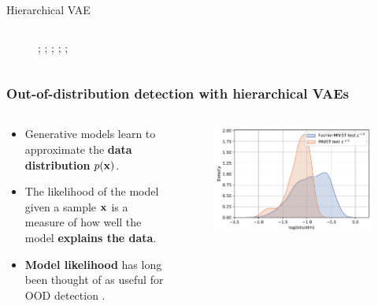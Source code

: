 \begin{frame}{Hierarchical VAE}
\begin{columns}
\begin{column}{0.3\textwidth}
\begin{figure}[.5\textwidth]
{          %
          ;
          ;
          ;
          ;
          ;
          }
          \end{figure}
      \end{column}
  \end{columns}
\end{frame}


\begin{frame}
    \frametitle{Out-of-distribution detection with hierarchical VAEs}
    \begin{columns}[t]
        \begin{column}{0.4\textwidth}
            \begin{itemize}
                \item Generative models learn to approximate the \textbf{data distribution} $p({\mathbf{x}})$.
                \item The likelihood of the model given a sample ${\mathbf{x}}$ is a measure of how well the model \textbf{explains the data}.
                \item \textbf{Model likelihood} has long been thought of as useful for OOD detection \cite{bishop_novelty_1994}.
            \end{itemize}
        \end{column}
        \begin{column}{0.6\textwidth}
            \begin{overprint}
                \begin{figure}
                    \centering
                    \includegraphics[width=\textwidth]{../graphics/paper_hierarchical/densities-FashionMNIST-test-MNIST-test-bpp-k-0_sohau.pdf}
                \end{figure}
            \end{overprint}
        \end{column}
    \end{columns}
\end{frame}


